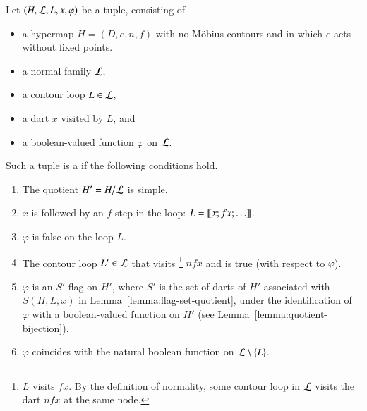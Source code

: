\begin{definition}\label{def:marked}
Let $(H,{\cal L},L,x,\varphi)$ be a tuple, consisting of 
\begin{itemize}
\item a hypermap $H=(D,e,n,f)$ with no M\"obius contours and in which $e$ acts without 
fixed points.  %
\item a
normal family ${\cal L}$, 
\item a contour loop $L\in{\cal L}$, 
\item a dart $x$ visited by $L$,
and 
\item a  boolean-valued function $\varphi$ on ${\cal L}$.
\end{itemize}
Such a tuple is a  if
the following conditions hold.
\begin{enumerate}
\item The quotient $H'=H/{\cal L}$ is simple.  
\item $x$ is followed by an $f$-step in the loop: $L = {\llbracket{x;fx;\ldots}\rrbracket}$.
\item $\varphi$ is false on the loop $L$.
\item The contour loop $L'\in {\cal L}$ that visits%
\footnote{$L$ visits  $f x$.  By the definition of normality, some contour loop in
${\cal L}$ visits the dart $n f x$ at the same node.} 
$n f x$ and is true (with respect to
$\varphi$).
\item 
  $\varphi$ is an $S'$-flag on $H'$, where $S'$ is the set of darts of $H'$
  associated with $S(H,L,x)$ in Lemma~\ref{lemma:flag-set-quotient},
  under the identification of $\varphi$ with a boolean-valued
  function on $H'$ (see Lemma~\ref{lemma:quotient-bijection}).
\item $\varphi$ coincides with the natural boolean function on ${\cal L}\setminus \{L\}$.
\end{enumerate}
\end{definition}







